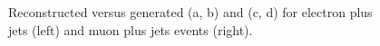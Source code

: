 \begin{figure}[hbtp]
	\centering
	\hfill
	\\ 
	\hfill
	\\ 
	\caption{Reconstructed versus generated \HT (a, b) and \ST (c, d) for electron plus jets (left) and muon plus jets
	events (right).}
	\label{fig:choice_of_bins_appendix_1}
 \end{figure}


